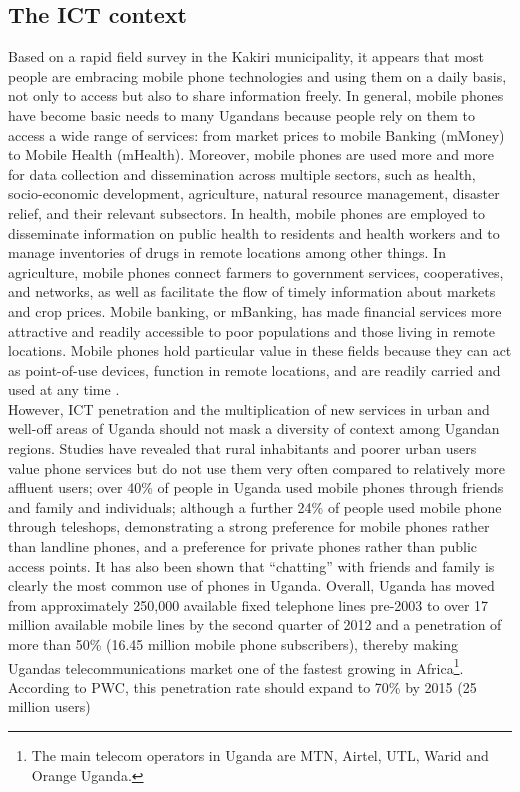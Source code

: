 \documentclass[11pt]{article}
\begin{document}
\subsection{The ICT context}
Based on a rapid field survey in the Kakiri municipality, it appears that most people are embracing mobile phone technologies and using them on a daily basis, not only to access but also to share information freely. In general, mobile phones have become basic needs to many Ugandans because people rely on them to access a wide range of services: from market prices to mobile Banking (mMoney) to Mobile Health (mHealth).
Moreover, mobile phones are used more and more for data collection and dissemination across multiple sectors, such as health, socio-economic development, agriculture, natural resource management, disaster relief, and their relevant subsectors. In health, mobile phones are employed to disseminate information on public health to residents and health workers and to manage inventories of drugs in remote locations among other things. In agriculture, mobile phones connect farmers to government services, cooperatives, and networks, as well as facilitate the flow of timely information about markets and crop prices. Mobile banking, or mBanking, has made financial services more attractive and readily accessible to poor populations and those living in remote locations\cite{Rikke10}. Mobile phones hold particular value in these fields because they can act as point-of-use devices, function in remote locations, and are readily carried and used at any time \cite{Kimberly11}\cite{Rikke10}.
\\
However, ICT penetration and the multiplication of new services in urban and well-off areas of Uganda should not mask a diversity of context among Ugandan regions. Studies have revealed that rural inhabitants and poorer urban users value phone services but do not use them very often compared to relatively more affluent users; over 40\% of people in Uganda used mobile phones through friends and family and individuals; although a further 24\% of people used mobile phone through teleshops, demonstrating a strong preference for mobile phones rather than landline phones, and a preference for private phones rather than public access points. It has also been shown that “chatting” with friends and family is clearly the most common use of phones in Uganda\cite{ Scott04}. Overall, Uganda has moved from approximately 250,000 available fixed telephone lines pre-2003 to over 17 million available mobile lines by the second quarter of 2012 and a penetration of more than 50\% (16.45 million mobile phone subscribers), thereby making Ugandas telecommunications market one of the fastest growing in Africa\footnote{The main telecom operators in Uganda are MTN, Airtel, UTL, Warid and Orange Uganda.}. According to PWC, this penetration rate should expand to 70\% by 2015 (25 million users) 
\end{document}
